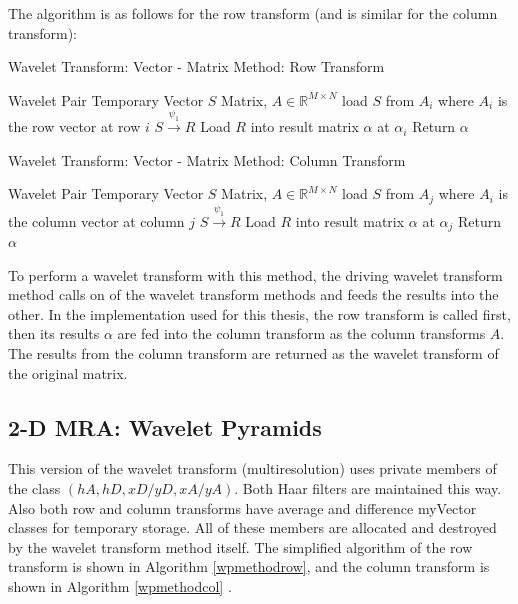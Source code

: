 The algorithm is as follows for the row transform (and is similar for the column transform):  

\begin{algorithm}
\caption{Wavelet Transform: Vector - Matrix Method: Row Transform }
\label{vmmethodrow}
\begin{algorithmic}
\REQUIRE  Wavelet Pair
\REQUIRE Temporary Vector $S$
\REQUIRE Matrix, $A \in {\mathbb R}^{M\times N}$
\STATE load $S$ from $A_i$ where $A_i$ is the row vector at row $i$
\STATE $S \stackrel{\psi_1}{\to} R$
\STATE Load $R$ into result matrix $\alpha$ at $\alpha_i$
\ENDFOR
\STATE Return $\alpha$
\end{algorithmic}
\end{algorithm}

\begin{algorithm}
\caption{Wavelet Transform: Vector - Matrix Method: Column Transform }
\label{vmmethodrow}
\begin{algorithmic}
\REQUIRE  Wavelet Pair
\REQUIRE Temporary Vector $S$
\REQUIRE Matrix, $A \in {\mathbb R}^{M\times N}$
\STATE load $S$ from $A_j$ where $A_i$ is the column vector at column $j$
\STATE $S \stackrel{\psi_1}{\to} R$
\STATE Load $R$ into result matrix $\alpha$ at $\alpha_j$
\ENDFOR
\STATE Return $\alpha$
\end{algorithmic}
\end{algorithm}

To perform a wavelet transform with this method, the driving wavelet transform method calls on of the wavelet transform methods and feeds the results into the other.  In the implementation used for this thesis, the row transform is called first,  then its results $\alpha$ are fed into the column transform as the column transforms $A$.  The results from the column transform are returned as the wavelet transform of the original matrix.  


\subsection{2-D MRA: Wavelet Pyramids}

This version of the wavelet transform (multiresolution) uses private members of the class $(hA, hD, xD/yD, xA/yA)$.  Both Haar filters are maintained this way.  Also both row and column transforms have average and difference myVector classes for temporary storage.   All of these members are allocated and destroyed by the wavelet transform method itself.   The simplified algorithm of the row transform is shown in Algorithm \ref{wpmethodrow}, and the column transform is shown in Algorithm \ref{wpmethodcol} .

